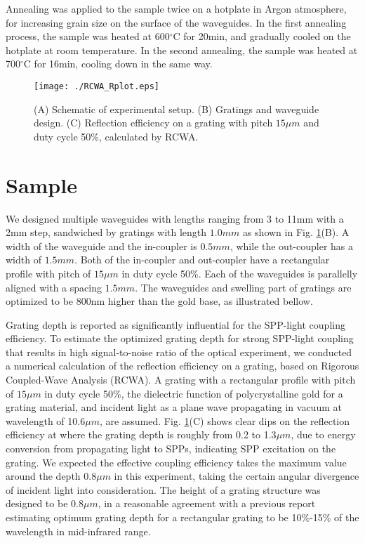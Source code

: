 \documentclass[twocolumn,11pt,a4]{article}
\begin{document}
Annealing was applied to the sample twice on a hotplate in Argon atmosphere, for increasing grain size on the surface of the waveguides\cite{Nogues}. In the first annealing process, the sample was heated at 600$^\circ\mathrm{C}$ for 20min, and gradually cooled on the hotplate at room temperature. In the second annealing, the sample was heated at 700$^\circ\mathrm{C}$ for 16min, cooling down in the same way.


 \begin{figure}[!htbp]
   \begin{center}
    \texttt{[image: ./RCWA\_Rplot.eps]}
    \caption{(A) Schematic of experimental setup. (B) Gratings and waveguide design. (C) Reflection efficiency on a grating with pitch $15\mu m$ and duty cycle 50\%, calculated by RCWA.}
     \label{fig:Experiment}
   \end{center}
\end{figure}

\section{Sample}
\label{sec:sample}
We designed multiple waveguides with lengths ranging from 3 to 11mm with a 2mm step, sandwiched by gratings with length $1.0mm$ as shown in Fig. \ref{fig:Experiment}(B). A width of the waveguide and the in-coupler is $0.5mm$, while the out-coupler has a width of $1.5mm$. Both of the in-coupler and out-coupler have a rectangular profile with pitch of $15\mu m$ in duty cycle 50\%. Each of the waveguides is parallelly aligned with a spacing $1.5mm$. The waveguides and swelling part of gratings are optimized to be 800nm higher than the gold base, as illustrated bellow.

Grating depth is reported as significantly influential for the SPP-light coupling efficiency\cite{Koev}\cite{Justin}. 
To estimate the optimized grating depth for strong SPP-light coupling that results in high signal-to-noise ratio of the optical experiment, we conducted a numerical calculation of  the reflection efficiency on a grating, based on Rigorous Coupled-Wave Analysis (RCWA)\cite{Leveque}. 
A grating with a rectangular profile with pitch of $15\mu m$  in duty cycle 50\%, the dielectric function of polycrystalline gold for a grating material, and incident light as a plane wave propagating in vacuum at wavelength of 10.6$\mu m$, are assumed.
Fig. \ref{fig:Experiment}(C) shows clear dips on the reflection efficiency at where the grating depth is roughly from 0.2 to 1.3$\mu m$, due to energy conversion from propagating light to SPPs, indicating SPP excitation on the grating.
We expected the effective coupling efficiency takes the maximum value around the depth 0.8$\mu m$ in this experiment, taking the certain angular divergence of incident light into consideration.
The height of a grating structure was designed to be 0.8$\mu m$, in a reasonable agreement with a previous report estimating optimum grating depth for a rectangular grating to be 10\%-15\% of the wavelength in mid-infrared range\cite{Justin}.
\end{document}
